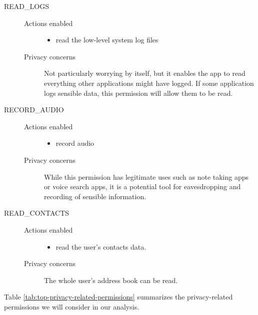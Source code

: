 \documentclass[twoside,letterpaper]{soups}
\theoremstyle{definition}
\begin{document}
\begin{description}
    \item[READ\_LOGS] \hfill
        \begin{description}
             \item[Actions enabled] \hfill
                \begin{itemize}
                    \item read the low-level system log files
                 \end{itemize} 
             \item[Privacy concerns]
                Not particularly worrying by itself, but it enables the app to read everything other applications might have logged. If some application logs sensible data, this permission will allow them to be read.
         \end{description} 

    \item[RECORD\_AUDIO] \hfill
        \begin{description}
             \item[Actions enabled] \hfill
                \begin{itemize}
                    \item record audio
                 \end{itemize} 
             \item[Privacy concerns]
                While this permission has legitimate uses such as note taking apps or voice search apps, it is a potential tool for eavesdropping and recording of sensible information. 
         \end{description}   

    \item[READ\_CONTACTS] \hfill
        \begin{description}
             \item[Actions enabled] \hfill
                \begin{itemize}
                    \item read the user's contacts data.
                 \end{itemize} 
             \item[Privacy concerns]
                The whole user's address book can be read. 
         \end{description}  

\end{description}

Table \autoref{tab:top-privacy-related-permissions} summarizes the privacy-related permissions we will consider in our analysis.
\end{document}
